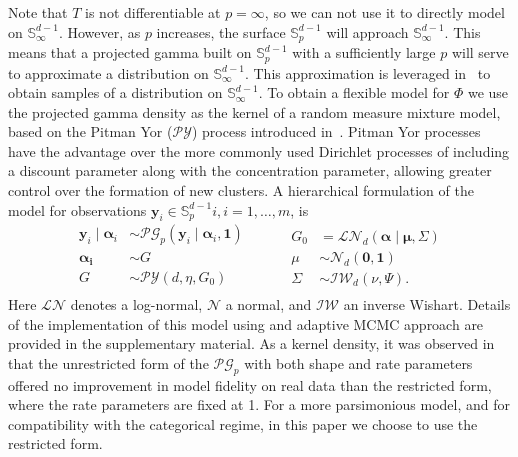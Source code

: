 Note that $T$ is not differentiable at $p = \infty$, so we can not use it to 
    directly model on ${\mathbb S}_{\infty}^{d-1}$. However, as $p$ increases,
    the surface $\mathbb{S}_p^{d-1}$ will approach $\mathbb{S}_{\infty}^{d-1}$.
    This means that a projected gamma built on $\mathbb{S}_p^{d-1}$ with a
    sufficiently large $p$ will serve to approximate a distribution on 
    $\mathbb{S}_{\infty}^{d-1}$.  This approximation is leveraged 
    in~\cite{trubey:pg} to obtain samples of a distribution on 
    ${\mathbb S}_{\infty}^{d-1}$. To obtain a flexible model for $\Phi$ we use 
    the projected gamma density as the kernel of a random measure mixture model, 
    based on the Pitman Yor ($\mathcal{PY}$) process introduced 
    in~\cite{perman1992}. Pitman Yor processes have the advantage over the more 
    commonly used Dirichlet processes \citep{Ferguson74} of including a 
    discount parameter along with the concentration parameter, allowing greater 
    control over the formation of new clusters.  A hierarchical formulation of 
    the model for observations 
    $\bm{y}_i\in \mathbb{S}_{p}^{d-1}i, i=1, \ldots,m$, is
    \begin{equation}
        \label{eqn:modelsphere}
        \begin{aligned}
        \bm{y}_i \mid \bm{\alpha}_i &\sim \mathcal{PG}_p
                \left(\bm{y}_i\mid\bm{\alpha}_i, \bm{1}\right)\\
        \bm{\alpha_i} &\sim G\\
        G &\sim \mathcal{PY}\left(d, \eta, G_0\right)\\
        \end{aligned}
        ~\hspace{1cm}
        \begin{aligned}
        G_0 &= \mathcal{LN}_d\left(\bm{\alpha}\mid\bm{\mu},\Sigma\right)\\
        \mu &\sim \mathcal{N}_d\left(\bm{0},\bm{1}\right)\\
        \Sigma &\sim \mathcal{IW}_d\left(\nu, \Psi\right).
        \end{aligned}
    \end{equation}
    Here $\mathcal{LN}$ denotes a log-normal, $\mathcal{N}$ a normal, and 
    $\mathcal{IW}$ an inverse Wishart. Details of the implementation of this 
    model using and adaptive MCMC approach are provided in the supplementary 
    material.  As a kernel density, it was observed in \cite{trubey:pg} that 
    the unrestricted form of the $\mathcal{PG}_p$ with both shape and rate 
    parameters offered no improvement in model fidelity on real data than the 
    restricted form, where the rate parameters are fixed at 1.  For a more 
    parsimonious model, and for compatibility with the categorical regime, in 
    this paper we choose to use the restricted form.
    
